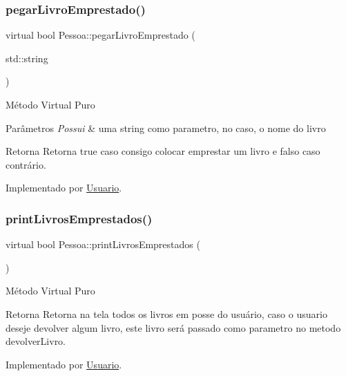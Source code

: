 \subsubsection{\texorpdfstring{pegarLivroEmprestado()}{pegarLivroEmprestado()}}
{\footnotesize\ttfamily virtual bool Pessoa\+::pegar\+Livro\+Emprestado (\begin{DoxyParamCaption}\item[{std\+::string}]{ }\end{DoxyParamCaption})\hspace{0.3cm}{\ttfamily [pure virtual]}}

Método Virtual Puro 
\begin{DoxyParams}{Parâmetros}
{\em Possui} & uma string como parametro, no caso, o nome do livro \\
\hline
\end{DoxyParams}
\begin{DoxyReturn}{Retorna}
Retorna true caso consigo colocar emprestar um livro e falso caso contrário. 
\end{DoxyReturn}


Implementado por \mbox{\hyperlink{class_usuario_a4466655ca0f573b8e46b2d62d16acb48}{Usuario}}.

\mbox{\label{class_pessoa_acf173c004fed24a7ab087951b3e35814}} 
\subsubsection{\texorpdfstring{printLivrosEmprestados()}{printLivrosEmprestados()}}
{\footnotesize\ttfamily virtual bool Pessoa\+::print\+Livros\+Emprestados (\begin{DoxyParamCaption}{ }\end{DoxyParamCaption})\hspace{0.3cm}{\ttfamily [pure virtual]}}

Método Virtual Puro \begin{DoxyReturn}{Retorna}
Retorna na tela todos os livros em posse do usuário, caso o usuario deseje devolver algum livro, este livro será passado como parametro no metodo devolver\+Livro. 
\end{DoxyReturn}


Implementado por \mbox{\hyperlink{class_usuario_ae654f1ccecd9db7278b891f72c13c025}{Usuario}}.

\mbox{\label{class_pessoa_ad405167e003a8b8960176b45ae70803c}} 
